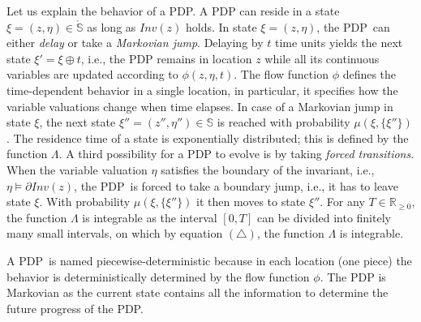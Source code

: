 \documentclass{LMCS}
\newcommand{\mb}{\mathbb}
\newcommand{\<}{\langle}
\renewcommand{\>}{\rangle}
\newcommand{\ges}{\geqslant}
\newcommand{\PDP}{\textsc{PDP}}
\newcommand{\Inv}{\mathit{Inv}}
\newcommand{\Reals}{\mathbb{R}}
\begin{document}
\noindent Let us explain the behavior of a PDP.
A PDP can reside in a state $\xi = (z,\eta) \in \mathring{\mb{S}}$ as long as
$\Inv(z)$ holds.
In state $\xi = (z,\eta)$, the \PDP\ can either \emph{delay} or take a
\emph{Markovian jump}.
Delaying by $t$ time units yields the next state $\xi' = \xi \oplus t$, i.e., the
PDP remains in location $z$ while all its continuous variables are updated
according to $\phi(z,\eta,t)$.
The flow function $\phi$ defines the time-dependent behavior in a single
location, in particular, it specifies how the variable valuations change when
time elapses.
In case of a Markovian jump in state $\xi$, the next state $\xi'' = (z'',\eta'')
\in \mb{S}$ is reached with probability $\mu(\xi,\{\xi''\})$.
The residence time of a state is exponentially distributed; this is defined
by the function $\Lambda$.
A third possibility for a PDP to evolve is by taking \emph{forced transitions}.
When the variable valuation $\eta$ satisfies the boundary of the invariant, i.e.,
$\eta \models \partial\Inv(z)$, the \PDP\ is forced to take a boundary jump,
i.e., it has to leave state $\xi$.
With probability $\mu(\xi,\{\xi''\})$ it then moves to state $\xi''$.
For any $T \in \Reals_{\ges 0}$, the function $\Lambda$ is integrable as the
interval $[0,T]$ can be divided into finitely many small intervals, on which
by equation $(\triangle)$, the function $\Lambda$ is integrable.

A \PDP\ is named piecewise-deterministic because in each location (one piece)
the behavior is deterministically determined by the flow function $\phi$.
The PDP is Markovian as the current state contains all the information to
determine the future progress of the PDP.
\end{document}
